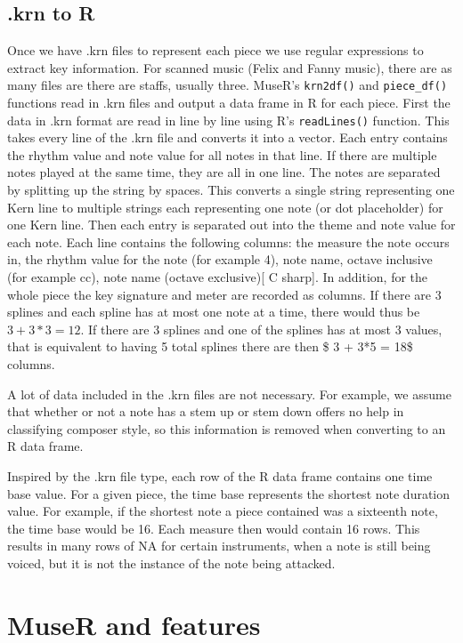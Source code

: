 \documentclass[12pt,twoside]{reedthesis}
\theoremstyle{definition}
\theoremstyle{definition}
\theoremstyle{definition}
\theoremstyle{remark}
\begin{document}
\section{.krn to R}\label{krn-to-r}

Once we have .krn files to represent each piece we use regular
expressions to extract key information. For scanned music (Felix and
Fanny music), there are as many files are there are staffs, usually
three. MuseR's \texttt{krn2df()} and \texttt{piece\_df()} functions read
in .krn files and output a data frame in R for each piece. First the
data in .krn format are read in line by line using R's
\texttt{readLines()} function. This takes every line of the .krn file
and converts it into a vector. Each entry contains the rhythm value and
note value for all notes in that line. If there are multiple notes
played at the same time, they are all in one line. The notes are
separated by splitting up the string by spaces. This converts a single
string representing one Kern line to multiple strings each representing
one note (or dot placeholder) for one Kern line. Then each entry is
separated out into the theme and note value for each note. Each line
contains the following columns: the measure the note occurs in, the
rhythm value for the note (for example 4), note name, octave inclusive
(for example cc), note name (octave exclusive){[} C sharp{]}. In
addition, for the whole piece the key signature and meter are recorded
as columns. If there are 3 splines and each spline has at most one note
at a time, there would thus be \(3 + 3*3=12\). If there are 3 splines
and one of the splines has at most 3 values, that is equivalent to
having 5 total splines there are then \$ 3 + 3*5 = 18\$ columns.

A lot of data included in the .krn files are not necessary. For example,
we assume that whether or not a note has a stem up or stem down offers
no help in classifying composer style, so this information is removed
when converting to an R data frame.

Inspired by the .krn file type, each row of the R data frame contains
one time base value. For a given piece, the time base represents the
shortest note duration value. For example, if the shortest note a piece
contained was a sixteenth note, the time base would be 16. Each measure
then would contain 16 rows. This results in many rows of NA for certain
instruments, when a note is still being voiced, but it is not the
instance of the note being attacked.

\chapter{MuseR and features}\label{muser-and-features}
\end{document}
